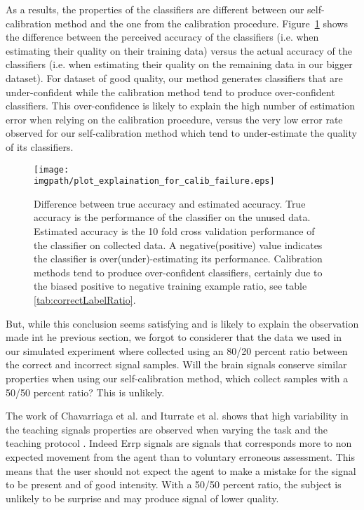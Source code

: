As a results, the properties of the classifiers are different between our self-calibration method and the one from the calibration procedure. Figure~\ref{fig:calibFail} shows the difference between the perceived accuracy of the classifiers (i.e. when estimating their quality on their training data) versus the actual accuracy of the classifiers (i.e. when estimating their quality on the remaining data in our bigger dataset). For dataset of good quality, our method generates classifiers that are under-confident while the calibration method tend to produce over-confident classifiers. This over-confidence is likely to explain the high number of estimation error when relying on the  calibration procedure, versus the very low error rate observed for our self-calibration method which tend to under-estimate the quality of its classifiers.

\begin{figure}[!htbp]
\centering
\texttt{[image: \\imgpath/plot\_explaination\_for\_calib\_failure.eps]}
\caption{Difference between true accuracy and estimated accuracy. True accuracy is the performance of the classifier on the unused data. Estimated accuracy is the 10 fold cross validation performance of the classifier on collected data. A negative(positive) value indicates the classifier is over(under)-estimating its performance. Calibration methods tend to produce over-confident classifiers, certainly due to the biased positive to negative training example ratio, see table \ref{tab:correctLabelRatio}.}
\label{fig:calibFail}
\end{figure}

But, while this conclusion seems satisfying and is likely to explain the observation made int he previous section, we forgot to considerer that the data we used in our simulated experiment where collected using an 80/20 percent ratio between the correct and incorrect signal samples. Will the brain signals conserve similar properties when using our self-calibration method, which collect samples with a 50/50 percent ratio? This is unlikely. 

The work of Chavarriaga et al. and Iturrate et al. shows that high variability in the teaching signals properties are observed when varying the task and the teaching protocol \cite{chavarriaga2010learning, iturrate2013task}. Indeed Errp signals are signals that corresponds more to non expected movement from the agent than to voluntary erroneous assessment. This means that the user should not expect the agent to make a mistake for the signal to be present and of good intensity. With a 50/50 percent ratio, the subject is unlikely to be surprise and may produce signal of lower quality.

